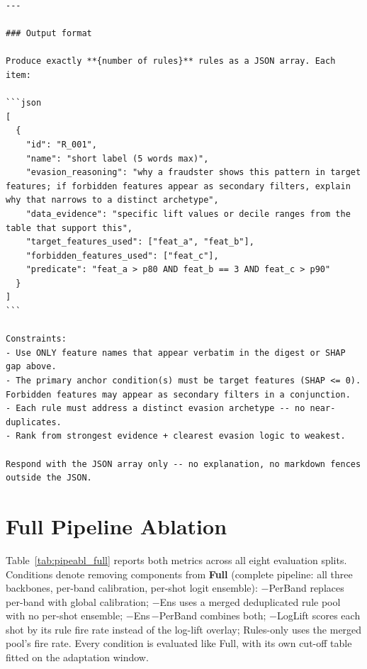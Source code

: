 \documentclass[11pt]{article}
\begin{document}
\begin{lstlisting}
---

### Output format

Produce exactly **{number of rules}** rules as a JSON array. Each item:

```json
[
  {
    "id": "R_001",
    "name": "short label (5 words max)",
    "evasion_reasoning": "why a fraudster shows this pattern in target features; if forbidden features appear as secondary filters, explain why that narrows to a distinct archetype",
    "data_evidence": "specific lift values or decile ranges from the table that support this",
    "target_features_used": ["feat_a", "feat_b"],
    "forbidden_features_used": ["feat_c"],
    "predicate": "feat_a > p80 AND feat_b == 3 AND feat_c > p90"
  }
]
```

Constraints:
- Use ONLY feature names that appear verbatim in the digest or SHAP gap above.
- The primary anchor condition(s) must be target features (SHAP <= 0). Forbidden features may appear as secondary filters in a conjunction.
- Each rule must address a distinct evasion archetype -- no near-duplicates.
- Rank from strongest evidence + clearest evasion logic to weakest.

Respond with the JSON array only -- no explanation, no markdown fences outside the JSON.
\end{lstlisting}

%
\section{Full Pipeline Ablation}
\label{sec:app_pipeabl}

Table~\ref{tab:pipeabl_full} reports both metrics across all eight evaluation splits.
Conditions denote removing components from \textbf{Full} (complete pipeline: all three backbones,
per-band calibration, per-shot logit ensemble): $-$PerBand replaces per-band with global
calibration; $-$Ens uses a merged deduplicated rule pool with no per-shot ensemble;
$-$Ens\,$-$PerBand combines both; $-$LogLift scores each shot by its rule fire rate instead of the
log-lift overlay; Rules-only uses the merged pool's fire rate. Every condition is evaluated like
Full, with its own cut-off table fitted on the adaptation window.
\end{document}
